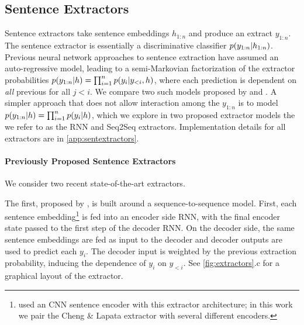 \subsection{Sentence Extractors} \label{sec:sext}



Sentence extractors take sentence embeddings $h_{1:n}$ and produce an extract $y_{1:n}$.
The sentence extractor is essentially a discriminative 
classifier $p(\slabel_{1:n} | \sentEmb_{1:n})$.
Previous neural network approaches to sentence extraction have assumed 
an auto-regressive model, leading to a semi-Markovian
factorization of the extractor probabilities 
$p(\slabel_{1:n}|\sentEmb)=\prod_{i=1}^\docSize 
p(\slabel[i]|\slabel[<i],\sentEmb)$,
where each prediction \slabel[i] is dependent on \emph{all} 
previous \slabel[j] for
all $j < i$. We compare two such models proposed by \citet{cheng2016neural}
and \citet{nallapati2017summarunner}.
A simpler approach that does not allow interaction among the $y_{1:n}$
is to 
  model $p(\slabel_{1:n}|\sentEmb) = \prod_{i=1}^n p(y_i|h)$, 
  which we explore in two proposed extractor models the we refer to as the RNN 
  and Seq2Seq extractors.
Implementation details for all extractors are in \autoref{app:sentextractors}.


\paragraph{Previously Proposed Sentence Extractors}
 We consider two recent state-of-the-art extractors.

 The first, proposed by 
\citet{cheng2016neural}, %
is built around a sequence-to-sequence model.
First, each sentence embedding\footnote{\citet{cheng2016neural} used an CNN sentence encoder with 
this extractor architecture; in this work we pair the Cheng \& Lapata extractor
with several different encoders.} is
fed into an encoder side RNN, with the final encoder state passed to the
first step of the decoder RNN. On the decoder side, the same sentence 
embeddings are fed as input to the decoder and decoder outputs are used to
predict each $y_i$. The decoder input is weighted by the previous extraction
probability, inducing the dependence of $y_i$ on $y_{<i}$.
See \autoref{fig:extractors}.c for a graphical layout of the extractor.

